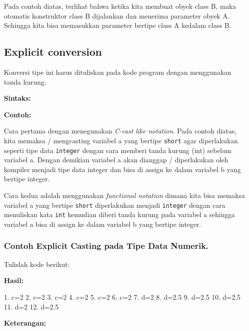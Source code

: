 Pada contoh diatas, terlihat bahwa ketika kita membuat obyek class B,
maka otomatis konstruktor class B dijalankan dan menerima parameter
obyek A. Sehingga kita bisa memasukkan parameter bertipe class A kedalam
class B.

\subsection{Explicit conversion}\label{explicit-conversion}

Konversi tipe ini harus dituliskan pada kode program dengan menggunakan
tanda kurung.

\textbf{Sintaks:}



\textbf{Contoh:}



Cara pertama dengan menegunakan \emph{C-cast like notation}. Pada contoh
diatas, kita memaksa / mengcasting variabel a yang bertipe
\texttt{short} agar diperlakukan seperti tipe data \texttt{integer}
dengan cara memberi tanda kurung (int) sebelum variabel a. Dengan
demikian variabel a akan dianggap / diperlakukan oleh kompiler menjadi
tipe data integer dan bisa di assign ke dalam variabel b yang bertipe
integer.

Cara kedua adalah menggunakan \emph{functional notation} dimana kita
bisa memaksa variabel a yang bertipe \texttt{short} diperlakukan menjadi
\texttt{integer} dengan cara menuliskan kata \texttt{int} kemudian
diberi tanda kurung pada variabel a sehingga variabel a bisa di assign
ke dalam variabel b yang bertipe integer.

\subsubsection*{Contoh Explicit Casting pada Tipe Data Numerik.}

Tulislah kode berikut:



\textbf{Hasil:}

\begin{lcverbatim}
1. c=2
2. c=2
3. c=2
4. c=2
5. c=2
6. c=2
7. d=2
8. d=2.5
9. d=2.5
10. d=2.5
11. d=2
12. d=2.5
\end{lcverbatim}
\textbf{Keterangan:}

